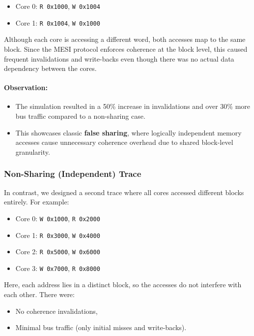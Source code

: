\documentclass{article}
\begin{document}
\begin{itemize}
    \item Core 0: \texttt{R 0x1000}, \texttt{W 0x1004}
    \item Core 1: \texttt{R 0x1004}, \texttt{W 0x1000}
\end{itemize}

Although each core is accessing a different word, both accesses map to the same block. Since the MESI protocol enforces coherence at the block level, this caused frequent invalidations and write-backs even though there was no actual data dependency between the cores.

\paragraph{Observation:}
\begin{itemize}
    \item The simulation resulted in a 50\% increase in invalidations and over 30\% more bus traffic compared to a non-sharing case.
    \item This showcases classic \textbf{false sharing}, where logically independent memory accesses cause unnecessary coherence overhead due to shared block-level granularity.
\end{itemize}

\subsubsection{Non-Sharing (Independent) Trace}

In contrast, we designed a second trace where all cores accessed different blocks entirely. For example:

\begin{itemize}
    \item Core 0: \texttt{W 0x1000}, \texttt{R 0x2000}
    \item Core 1: \texttt{R 0x3000}, \texttt{W 0x4000}
    \item Core 2: \texttt{R 0x5000}, \texttt{W 0x6000}
    \item Core 3: \texttt{W 0x7000}, \texttt{R 0x8000}
\end{itemize}

Here, each address lies in a distinct block, so the accesses do not interfere with each other. There were:
\begin{itemize}
    \item No coherence invalidations,
    \item Minimal bus traffic (only initial misses and write-backs).
\end{itemize}
\end{document}
